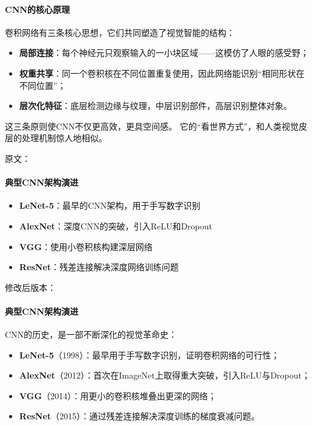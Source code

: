 \paragraph{CNN的核心原理}  
卷积网络有三条核心思想，它们共同塑造了视觉智能的结构：

\begin{itemize}
\item \textbf{局部连接}：每个神经元只观察输入的一小块区域——这模仿了人眼的感受野；
\item \textbf{权重共享}：同一个卷积核在不同位置重复使用，因此网络能识别“相同形状在不同位置”；
\item \textbf{层次化特征}：底层检测边缘与纹理，中层识别部件，高层识别整体对象。
\end{itemize}

这三条原则使CNN不仅更高效，更具空间感。  
它的“看世界方式”，和人类视觉皮层的处理机制惊人地相似。



原文：
\paragraph{典型CNN架构演进}
\begin{itemize}
\item \textbf{LeNet-5}：最早的CNN架构，用于手写数字识别
\item \textbf{AlexNet}：深度CNN的突破，引入ReLU和Dropout
\item \textbf{VGG}：使用小卷积核构建深层网络
\item \textbf{ResNet}：残差连接解决深度网络训练问题
\end{itemize}
修改后版本：
\paragraph{典型CNN架构演进}  
CNN的历史，是一部不断深化的视觉革命史：  

\begin{itemize}
\item \textbf{LeNet-5}（1998）：最早用于手写数字识别，证明卷积网络的可行性；
\item \textbf{AlexNet}（2012）：首次在ImageNet上取得重大突破，引入ReLU与Dropout；
\item \textbf{VGG}（2014）：用更小的卷积核堆叠出更深的网络；
\item \textbf{ResNet}（2015）：通过残差连接解决深度训练的梯度衰减问题。
\end{itemize}

